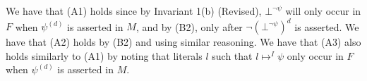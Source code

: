 \documentclass{llncs}
\begin{document}
We have that (A1) holds since by Invariant 1(b) (Revised), $\bot^{\neg \psi}$ will only occur in $F$ when $\psi^{(d)}$ is asserted in $M$, and by (B2), only after $\neg (\bot^{\neg \psi})^d$ is asserted.
We have that (A2) holds by (B2) and using similar reasoning.
We have that (A3) also holds similarly to (A1) by noting that literals $l$ such that $l \mapsto^I \psi$ only occur in $F$ when $\psi^{(d)}$ is asserted in $M$.
\end{document}
